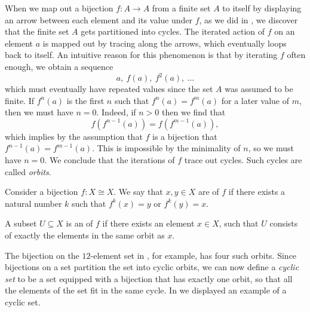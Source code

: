 When we map out a bijection $f:A\to A$ from a finite set $A$ to itself by displaying an arrow between each element and its value under $f$, as we did in , we discover that the finite set $A$ gets partitioned into cycles. The iterated action of $f$ on an element $a$ is mapped out by tracing along the arrows, which eventually loops back to itself. An intuitive reason for this phenomenon is that by iterating $f$ often enough, we obtain a sequence
\begin{equation*}
  a,~f(a),~f^2(a),~\ldots
\end{equation*}
which must eventually have repeated values since the set $A$ was assumed to be finite. If $f^n(a)$ is the first $n$ such that $f^n(a)=f^m(a)$ for a later value of $m$, then we must have $n=0$. Indeed, if $n>0$ then we find that
\begin{equation*}
  f(f^{n-1}(a))=f(f^{m-1}(a)),
\end{equation*}
which implies by the assumption that $f$ is a bijection that $f^{n-1}(a)=f^{m-1}(a)$. This is impossible by the minimality of $n$, so we must have $n=0$. We conclude that the iterations of $f$ trace out cycles. Such cycles are called \emph{orbits}.

\begin{definition}\label{definition:orbits}
  Consider a bijection $f:X\cong X$. We say that $x,y\in X$ are  of $f$ if there exists a natural number $k$ such that $f^k(x)=y$ or $f^k(y)=x$.

  A subset $U\subseteq X$ is an  of $f$ if there exists an element $x\in X$, such that $U$ consists of exactly the elements in the same orbit as $x$.
\end{definition}

The bijection on the $12$-element set in , for example, has four such orbits. Since bijections on a set partition the set into cyclic orbits, we can now define a \emph{cyclic set} to be a set equipped with a bijection that has exactly one orbit, so that all the elements of the set fit in the same cycle. In  we displayed an example of a cyclic set.

